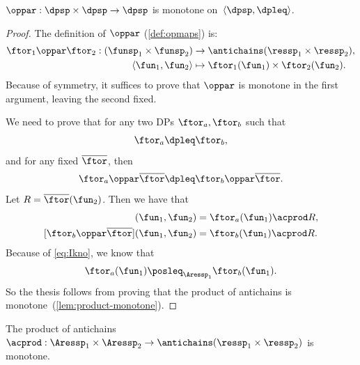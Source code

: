 \begin{lemma}
    \label{lem:par-monotone}$\oppar:\dpsp\times\dpsp\rightarrow\dpsp$
    is monotone on~$\langle\dpsp,\dpleq\rangle$.
\end{lemma}
\begin{proof}
    The definition of $\oppar$ (\cref{def:opmaps}) is:
    \begin{align*}
        \ftor_{1}\oppar\ftor_{2}:(\funsp_{1}\times\funsp_{2}) & \rightarrow\antichains(\ressp_{1}\times\ressp_{2}),\\
        \left\langle \fun_{1},\fun_{2}\right\rangle  & \mapsto\ftor_{1}(\fun_{1})\times\ftor_{2}(\fun_{2}).
    \end{align*}
    Because of symmetry, it suffices to prove that $\oppar$ is monotone
    in the first argument, leaving the second fixed.

    We need to prove that for any two DPs $\ftor_{a},\ftor_{b}$ such
    that
    \begin{equation}
        \ftor_{a}\dpleq\ftor_{b},\label{eq:Ikno}
    \end{equation}
    and for any fixed $\overline{\ftor}$, then
    \[
        \ftor_{a}\oppar\overline{\ftor}\dpleq\ftor_{b}\oppar\overline{\ftor}.
    \]
    Let $R=\overline{\ftor}(\fun_{2})$. Then we have that
    \begin{align*}
    [\ftor_{a}\oppar\overline{\ftor}]
    (\fun_{1},\fun_{2})
        & =\ftor_{a}(\fun_{1})\acprod R,\\{}
        [\ftor_{b}\oppar\overline{\ftor}](\fun_{1},\fun_{2}) & =\ftor_{b}(\fun_{1})\acprod R.
    \end{align*}
    Because of \cref{eq:Ikno}, we know that
    \[
        \ftor_{a}(\fun_{1})\posleq_{\Aressp_{1}}\ftor_{b}(\fun_{1}).
    \]
    So the thesis follows from proving that the product of antichains
    is monotone~(\cref{lem:product-monotone}).
\end{proof}
\begin{lemma}
    \label{lem:product-monotone}The product of antichains~$\acprod:\Aressp_{1}\times\Aressp_{2}\rightarrow\antichains(\ressp_{1}\times\ressp_{2})$
    is monotone.
\end{lemma}

